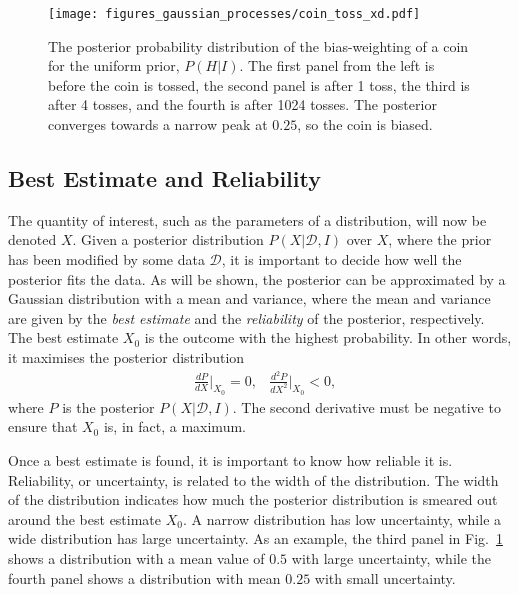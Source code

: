 \documentclass[twoside,english]{uiofysmaster}
\begin{document}
{{\begin{figure}
\texttt{[image: figures\_gaussian\_processes/coin\_toss\_xd.pdf]}
\caption{The posterior probability distribution of the bias-weighting of a coin for the uniform prior, $P(H|I)$. The first panel from the left is before the coin is tossed, the second panel is after 1 toss, the third is after 4 tosses, and the fourth is after 1024 tosses. The posterior converges towards a narrow peak at $0.25$, so the coin is biased.}
\label{Fig:: gaussian process : Dice throw }
\end{figure}


\subsection{Best Estimate and Reliability}\label{Sec:: gaussian process : Best estimate}

The quantity of interest, such as the parameters of a distribution, will now be denoted $X$. Given a posterior distribution $P(X| \mathcal{D}, I)$ over $X$, where the prior has been modified by some data $\mathcal{D}$, it is important to decide how well the posterior fits the data. As will be shown, the posterior can be approximated by a Gaussian distribution with a mean and variance, where the mean and variance are given by the \textit{best estimate} and the \textit{reliability} of the posterior, respectively. The best estimate $X_0$  is the outcome with the highest probability. In other words, it maximises the posterior distribution
\begin{align}\label{Eq:: gaussian process : max of posterior}
&\frac{dP}{dX}\Big|_{X_0} = 0, &\frac{d^2P}{dX^2}\Big|_{X_0} < 0,
\end{align}
where $P$ is the posterior $P(X| \mathcal{D}, I)$. The second derivative must be negative to ensure that $X_0$ is, in fact, a maximum. 

Once a best estimate is found, it is important to know how reliable it is. Reliability, or uncertainty, is related to the width of the distribution. The width of the distribution indicates how much the posterior distribution is smeared out around the best estimate $X_0$. A narrow distribution has low uncertainty, while a wide distribution has large uncertainty. As an example, the third panel in Fig.~\ref{Fig:: gaussian process : Dice throw } shows a distribution with a mean value of $0.5$ with large uncertainty, while the fourth panel shows a distribution with mean $0.25$ with small uncertainty. 

}}
\end{document}
